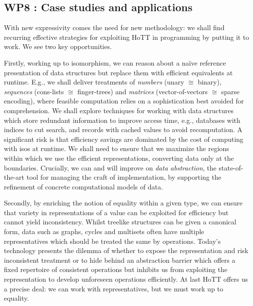 \documentclass[twocolumn,a4paper,11pt]{article}
\newcommand{\iso}{\cong}
\begin{document}

  

\subsection*{WP8 : Case studies and applications} 

With new expressivity comes the need for new
methodology: we shall find recurring effective strategies for
exploiting HoTT in programming by putting it to work. We see two
key opportunities.

Firstly, working up to isomorphism, we can reason about a na\"ive
reference presentation of data structures but replace them with
efficient equivalents at runtime. E.g., we shall deliver treatments of
\emph{numbers} (unary $\iso$ binary), \emph{sequences} (cons-lists
$\iso$ finger-trees) and \emph{matrices} (vector-of-vectors $\iso$
sparse encoding), where feasible computation relies on a
sophistication best avoided for comprehension. We shall explore
techniques for working with data structures which store redundant
information to improve access time, e.g., databases with indices to
cut search, and records with cached values to avoid recomputation. A
significant risk is that efficiency savings are dominated by the cost
of computing with isos at runtime. We shall need to ensure that we
maximize the regions within which we use the efficient
representations, converting data only at the boundaries.  Crucially,
we can and will improve on \emph{data abstraction}, the
state-of-the-art tool for managing the craft of implementation, by
supporting the refinement of concrete computational models of data.

Secondly, by enriching the notion of equality within a given type, we
can ensure that variety in representations of a value can be exploited
for efficiency but cannot yield inconsistency. Whilst treelike
structures can be given a canonical form, data such as graphs, cycles
and multisets often have multiple representatives which should be
treated the same by operations. Today's technology presents the
dilemma of whether to expose the representation and risk inconsistent
treatment or to hide behind an abstraction barrier which offers a
fixed repertoire of consistent operations but inhibits us from
exploiting the representation to develop unforeseen operations
efficiently. At last HoTT offers us a precise deal: we can work with
representatives, but we must work up to equality.
\end{document}
